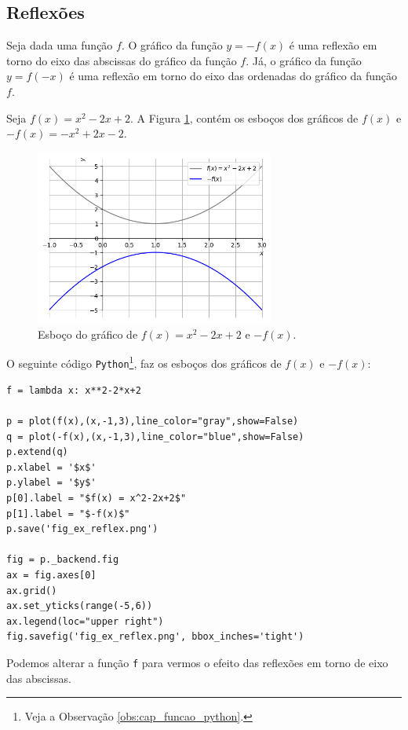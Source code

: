 \subsection{Reflexões}

Seja dada uma função $f$. O gráfico da função $y = -f(x)$ é uma reflexão em torno do eixo das abscissas do gráfico da função $f$. Já, o gráfico da função $y = f(-x)$ é uma reflexão em torno do eixo das ordenadas do gráfico da função $f$.

\begin{ex}
  Seja $f(x) = x^2-2x+2$. A Figura \ref{fig:ex_reflex}, contém os esboços dos gráficos de $f(x)$ e $-f(x) = -x^2+2x-2$.

  \begin{figure}[H]
    \centering
    \includegraphics[width=0.7\textwidth]{./cap_funcao/dados/fig_ex_reflex/fig_ex_reflex}
    \caption{Esboço do gráfico de $f(x) = x^2-2x+2$ e $-f(x)$.}
    \label{fig:ex_reflex}
  \end{figure}

  \ifispython
  O seguinte código \verb+Python+\footnote{Veja a Observação \ref{obs:cap_funcao_python}.}, faz os esboços dos gráficos de $f(x)$ e $-f(x)$:
\begin{verbatim}
f = lambda x: x**2-2*x+2

p = plot(f(x),(x,-1,3),line_color="gray",show=False)
q = plot(-f(x),(x,-1,3),line_color="blue",show=False)
p.extend(q)
p.xlabel = '$x$'
p.ylabel = '$y$'
p[0].label = "$f(x) = x^2-2x+2$"
p[1].label = "$-f(x)$"
p.save('fig_ex_reflex.png')

fig = p._backend.fig
ax = fig.axes[0]
ax.grid()
ax.set_yticks(range(-5,6))
ax.legend(loc="upper right")
fig.savefig('fig_ex_reflex.png', bbox_inches='tight')
\end{verbatim}
  Podemos alterar a função \verb+f+ para vermos o efeito das reflexões em torno de eixo das abscissas.
  \fi
\end{ex}


